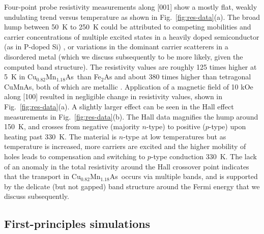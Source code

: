 \documentclass[10pt,doublespacing,edeposit]{uiucthesis2020}
\newcommand*{\cumnas}{Cu$_{0.82}$Mn$_{1.18}$As}
\begin{document}
\begin{mainmatter}
Four-point probe resistivity measurements along [001] show a mostly flat, weakly undulating trend versus temperature as shown in Fig.\ \ref{fig:res-data}(a).
The broad hump between 50~K to 250~K could be attributed to competing mobilities and carrier concentrations of multiple excited states in a heavily doped semiconductor (as in P-doped Si) \cite{Chapman1963}, or variations in the dominant carrier scatterers in a disordered metal (which we discuss subsequently to be more likely, given the computed band structure).
The resistivity values are roughly 125 times higher at 5~K in \cumnas\ than Fe$_2$As and about 380 times higher than tetragonal CuMnAs, both of which are metallic \cite{Takeshita2017,Wadley2013}.
Application of a magnetic field of 10 kOe along [100]  resulted in negligible change in resistivity values, shown in Fig.\ \ref{fig:res-data}(a).
A slightly larger effect can be seen in the Hall effect measurements in Fig.\ \ref{fig:res-data}(b).
The Hall data magnifies the hump around 150~K, and crosses from negative (majority $n$-type) to positive ($p$-type) upon heating past 330~K. 
The material is $n$-type at low temperatures but as temperature is increased, more carriers are excited and the higher mobility of holes leads to compensation and switching to $p$-type conduction 330~K.
The lack of an anomaly in the total resistivity around the Hall crossover point indicates that the transport in \cumnas\ occurs via multiple bands, and is supported by the delicate (but not gapped) band structure around the Fermi energy  that we discuss subsequently. 

\subsection{First-principles simulations}


\end{mainmatter}
\end{document}
